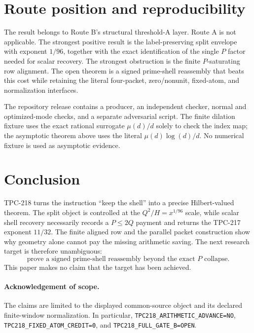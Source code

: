 \documentclass[11pt]{article}
\theoremstyle{remark}
\begin{document}
\section{Route position and reproducibility}

The result belongs to Route B's structural threshold-A layer.  Route A is not
applicable.  The strongest positive result is the label-preserving split
envelope with exponent $1/96$, together with the exact identification of the
single $P$ factor needed for scalar recovery.  The strongest obstruction is
the finite $P$-saturating row alignment.  The open theorem is a signed
prime-shell reassembly that beats this cost while retaining the literal
four-packet, zero/nonunit, fixed-atom, and normalization interfaces.

The repository release contains a producer, an independent checker, normal and
optimized-mode checks, and a separate adversarial script.  The finite
dilation fixture uses the exact rational surrogate $\mu(d)/d$ solely to check
the index map; the asymptotic theorem above uses the literal
$\mu(d)\log(d)/d$.  No numerical fixture is used as asymptotic evidence.

\section{Conclusion}

TPC-218 turns the instruction \textquotedblleft keep the shell\textquotedblright
into a precise Hilbert-valued theorem.  The split object is controlled at the
$Q^2/H=x^{1/96}$ scale, while scalar shell recovery necessarily records a
$P\leq2Q$ payment and returns the TPC-217 exponent $11/32$.  The finite
aligned row and the parallel packet construction show why geometry alone
cannot pay the missing arithmetic saving.  The next research target is
therefore unambiguous:
\[
 \text{prove a signed prime-shell reassembly beyond the exact \(P\) collapse.}
\]
This paper makes no claim that the target has been achieved.

\paragraph{Acknowledgement of scope.}
The claims are limited to the displayed common-source object and its declared
finite-window normalization.  In particular,
\texttt{TPC218\_ARITHMETIC\_ADVANCE=NO},
\texttt{TPC218\_FIXED\_ATOM\_CREDIT=0}, and
\texttt{TPC218\_FULL\_GATE\_B=OPEN}.



\end{document}
